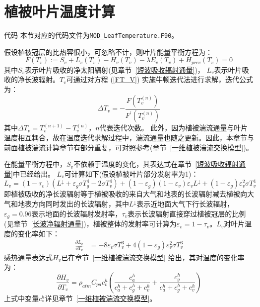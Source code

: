 \chapter{植被叶片温度计算}\label{植被叶片温度计算}
\begin{mymdframed}{代码}
本节对应的代码文件为\texttt{MOD\_LeafTemperature.F90}。
\end{mymdframed}

假设植被冠层的比热容很小，可忽略不计，则叶片能量平衡方程为：
\begin{equation}\label{FT_V}
F\left(T_{v}\right):=S_{v}+L_{v}\left(T_{v}\right)-H_{v}\left(T_{v}\right)-\lambda E_{v}\left(T_{v}\right)+H_{p r c v}\left(T_{v}\right)=0
\end{equation}
其中$S_v$表示叶片吸收的净太阳辐射(见章节~\ref{短波吸收辐射通量})，
$L_v$表示叶片吸收的净长波辐射。$T_v$可通过对方程 (\ref{FT_V}) 实施牛顿迭代法进行求解，迭代公式为：
\begin{equation}
\Delta T_{v}=-\frac{F\left(T_{v}^{(n)}\right)}{F^{\prime}\left(T_{v}^{(n)}\right)}
\end{equation}
其中$\Delta T_v=T_v^{\left(n+1\right)}-T_v^{\left(n\right)}$，$n$代表迭代次数。
此外，因为植被湍流通量与叶片温度相互耦合，故在温度迭代求解过程中，湍流通量也随之更新。因此，本章节与前面植被湍流计算章节有部分重复，可对照参考(章节~\ref{一维植被湍流交换模型})。

在能量平衡方程中，$S_v$不依赖于温度的变化，其表达式在章节~\ref{短波吸收辐射通量}中已经给出。
$L_v$可计算如下(假设植被叶片部分发射率为1)：
\begin{equation}
L_{v}=\left(1-\tau_{v}\right)\left(L ^\downarrow+\varepsilon_{g} \sigma T_{g}^{4}-2 \sigma T_{v}^{4}\right) + \left( 1- \varepsilon_{g} \right )\left(1-\varepsilon_{v} \right)\varepsilon_{v} L^\downarrow + \left( 1- \varepsilon_{g} \right ) \varepsilon_{v}^2 \sigma T_{v}^4
\end{equation}
即植被吸收的净长波辐射等于植被吸收的来自大气和地表的长波辐射减去植被向大气和地表方向同时发出的长波辐射，其中$L^\downarrow$表示近地面大气下行长波辐射，$\varepsilon_g=0.96$表示地面的长波辐射发射率，$\tau_{v}$表示长波辐射直接穿过植被冠层的比例(见章节~\ref{长波净辐射通量})，植被整体的发射率可计算为$\varepsilon_v=1-\tau_v$。$L_v$对叶片温度的变化率如下：
\begin{equation}
\begin{aligned}
 \frac{\partial L_{v}}{\partial T_{v}} &= -8 \varepsilon_{v}\sigma T_{v}^{3} + 4 \left( 1- \varepsilon_{g} \right ) \varepsilon_{v}^2 \sigma T_{v}^3
\end{aligned}
\end{equation}
感热通量表达式$H_{v}$已在章节~\ref{一维植被湍流交换模型} 给出，其对温度的变化率为：
\begin{equation}
\frac{\partial H_{v}}{\partial T_{v}}=\rho_{atm} C_{pa} c_{v}^{h} \left( \frac{c_{a}^{h}}{c_{a}^{h} + c_{g}^{h} + c_{v}^{h}} + \frac{c_{g}^{h}}{c_{a}^{h} + c_{g}^{h} + c_{v}^{h}} \right)
\end{equation}
上式中变量$c_*^h$详见章节~\ref{一维植被湍流交换模型}。

